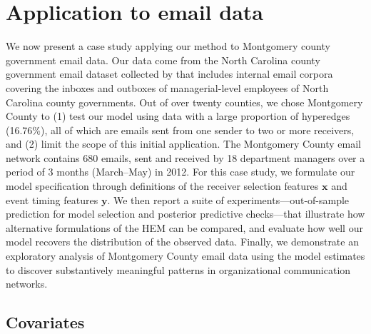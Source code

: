\documentclass[ba]{imsart}
\numberwithin{equation}{section}
\theoremstyle{plain}
\begin{document}
	\section{Application to email data}\label{sec:Emails}
	We now present a case study applying our method to Montgomery county government email data.
	Our data come from the North Carolina county government email dataset collected by \cite{ben2017transparency} that includes internal email corpora covering the inboxes and outboxes of managerial-level employees of North Carolina county governments. Out of over twenty counties, we chose Montgomery County to (1) test our model using data with a large proportion of hyperedges (16.76\%), all of which are emails sent from one sender to two or more receivers, and (2) limit the scope of this initial application. The Montgomery County email network contains 680 emails, sent and received by 18 department managers over a period of 3 months (March--May) in 2012. For this case study,
	we formulate our model specification through definitions of the receiver selection features $\boldsymbol{x}$ and event timing features $\boldsymbol{y}$. We then report a suite of experiments---out-of-sample prediction for model selection and posterior predictive checks---that illustrate how alternative formulations of the HEM can be compared, and evaluate how well our model recovers the distribution of the observed data. Finally, we demonstrate an exploratory analysis of Montgomery County email data using the model estimates to discover substantively meaningful patterns in organizational communication networks.
	\subsection{Covariates}\label{subsec:Covariates_email}
\end{document}
